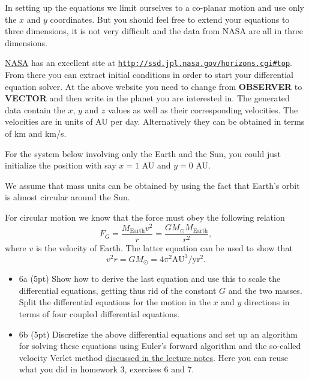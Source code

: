 \documentclass[%
oneside,                 %
final,                   %
10pt]{article}
\begin{document}
\noindent

In setting up the equations we limit ourselves to a co-planar
motion and use only the $x$ and $y$ coordinates. But you should feel
free to extend your equations to three dimensions, it is not very
difficult and the data from NASA are all in three dimensions.

\href{{http://www.nasa.gov/index.html}}{NASA} has an excellent site at \href{{http://ssd.jpl.nasa.gov/horizons.cgi#top}}{\nolinkurl{http://ssd.jpl.nasa.gov/horizons.cgi\#top}}.
From there you can extract initial conditions in order to start your differential equation solver.
At the above website you need to change from \textbf{OBSERVER} to \textbf{VECTOR} and then write in the planet you are interested in.
The generated data contain the $x$, $y$ and $z$ values as well as their corresponding velocities. The velocities are in units of AU per day.
Alternatively they can be obtained in terms of km and km/s. 

For the system below involving only the Earth and the Sun, you
could just initialize the position with say $x=1$ AU and $y=0$ AU.



We assume that mass units can be obtained by using the fact that Earth's orbit is almost circular around the Sun.

For circular motion we know that the force must obey the following relation
\[
F_G= \frac{M_{\mathrm{Earth}}v^2}{r}=\frac{GM_{\odot}M_{\mathrm{Earth}}}{r^2},
\]
where $v$ is the velocity of Earth. 
The latter equation can be used to show that
\[
v^2r=GM_{\odot}=4\pi^2\mathrm{AU}^3/\mathrm{yr}^2.
\]
\begin{itemize}
\item 6a (5pt) Show how to derive the last equation and use this to scale the differential equations, getting thus rid of the constant $G$ and the two masses. Split the differential equations for the motion in the $x$ and $y$ directions in terms of four coupled differential equations.

\item 6b (5pt)  Discretize the above differential equations and set up an algorithm for solving these equations using Euler's forward algorithm and the so-called velocity Verlet method \href{{https://mhjensen.github.io/Physics321/doc/pub/energyconserv/html/energyconserv.html}}{discussed in the lecture notes}. Here you can reuse what you did in homework 3, exercises 6 and 7. 
\end{itemize}
\end{document}
